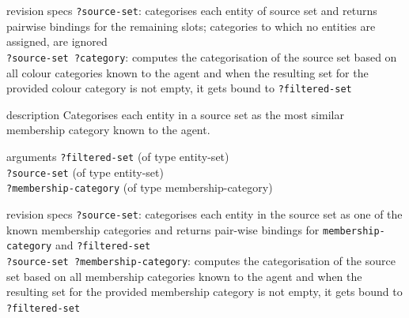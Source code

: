 \begin{explanation}{revision specs}
  \verb+?source-set+: categorises each entity of source set and
  returns pairwise bindings for the remaining slots; categories
  to which no entities are assigned, are ignored \\
  \verb+?source-set ?category+: computes the categorisation of the
  source set based on all colour categories known to the agent and
  when the resulting set for the provided colour category is not
  empty, it gets bound to \verb+?filtered-set+
\end{explanation}


\begin{explanation}{description}
  Categorises each entity in a source set as the most similar
  membership category known to the agent.
\end{explanation}

\begin{explanation}{arguments}
  \verb+?filtered-set+ (of type entity-set) \\
  \verb+?source-set+ (of type entity-set) \\
  \verb+?membership-category+ (of type membership-category)
\end{explanation}

\begin{explanation}{revision specs}
  \verb+?source-set+: categorises each entity in the source set as one
  of the known membership categories and returns pair-wise bindings
  for \verb+membership-category+ and \verb+?filtered-set+ \\
  \verb+?source-set ?membership-category+: computes the categorisation
  of the source set based on all membership categories known to the
  agent and when the resulting set for the provided membership category
  is not empty, it gets bound to \verb+?filtered-set+
\end{explanation}




